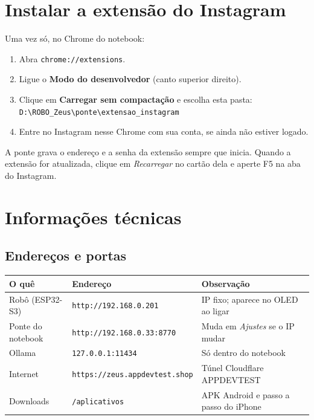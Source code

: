 \documentclass[11pt,a4paper]{article}
\newcommand{\bs}{\textbackslash\allowbreak}
\begin{document}
\appendix
\section{Instalar a extensão do Instagram}\label{ap:extensao}
Uma vez só, no Chrome do notebook:
\begin{enumerate}
  \item Abra \texttt{chrome://extensions}.
  \item Ligue o \textbf{Modo do desenvolvedor} (canto superior direito).
  \item Clique em \textbf{Carregar sem compactação} e escolha esta pasta:\\
        \texttt{D:\bs{}ROBO\_Zeus\bs{}ponte\bs{}extensao\_instagram}
  \item Entre no Instagram nesse Chrome com sua conta, se ainda não estiver logado.
\end{enumerate}
A ponte grava o endereço e a senha da extensão sempre que inicia. Quando a extensão for atualizada,
clique em \emph{Recarregar} no cartão dela e aperte F5 na aba do Instagram.

\section{Informações técnicas}\label{ap:tecnico}

\subsection{Endereços e portas}
\begin{tabularx}{\linewidth}{@{}l l X@{}}
\toprule
\textbf{O quê} & \textbf{Endereço} & \textbf{Observação} \\ \midrule
Robô (ESP32-S3) & \texttt{http://192.168.0.201} & IP fixo; aparece no OLED ao ligar \\
Ponte do notebook & \texttt{http://192.168.0.33:8770} & Muda em \emph{Ajustes} se o IP mudar \\
Ollama & \texttt{127.0.0.1:11434} & Só dentro do notebook \\
Internet & \texttt{https://zeus.appdevtest.shop} & Túnel Cloudflare APPDEVTEST \\
Downloads & \texttt{/aplicativos} & APK Android e passo a passo do iPhone \\
\bottomrule
\end{tabularx}
\end{document}
